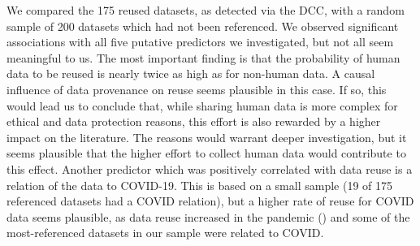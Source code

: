 \documentclass[
  letterpaper,
  DIV=11,
  numbers=noendperiod]{scrartcl}
\begin{document}
We compared the 175 reused datasets, as detected via the DCC, with a
random sample of 200 datasets which had not been referenced. We observed
significant associations with all five putative predictors we
investigated, but not all seem meaningful to us. The most important
finding is that the probability of human data to be reused is nearly
twice as high as for non-human data. A causal influence of data
provenance on reuse seems plausible in this case. If so, this would lead
us to conclude that, while sharing human data is more complex for
ethical and data protection reasons, this effort is also rewarded by a
higher impact on the literature. The reasons would warrant deeper
investigation, but it seems plausible that the higher effort to collect
human data would contribute to this effect. Another predictor which was
positively correlated with data reuse is a relation of the data to
COVID-19. This is based on a small sample (19 of 175 referenced datasets
had a COVID relation), but a higher rate of reuse for COVID data seems
plausible, as data reuse increased in the pandemic
()
and some of the most-referenced datasets in our sample were related to
COVID.
\end{document}

